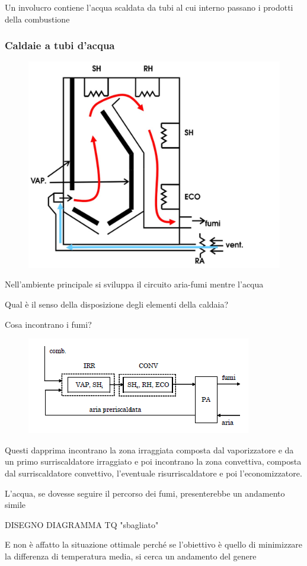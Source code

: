 \begin{adjustwidth}{2in}{}
			Un involucro contiene l'acqua scaldata da tubi al cui interno passano i prodotti della combustione
\subsubsection{Caldaie a tubi d'acqua}
			\begin{figure}[H]
				\centering
				\includegraphics[width=0.5\linewidth]{immagini/Immagine12}
				\label{fig:immagine12}
			\end{figure}			
			Nell'ambiente principale si sviluppa il circuito aria-fumi mentre l'acqua 
			
			Qual è il senso della disposizione degli elementi della caldaia? 
		
			Cosa incontrano i fumi? 
			\begin{figure}[H]
				\centering
				\includegraphics[width=0.5\linewidth]{immagini/GeneratoreVapore1}
				\label{fig:generatorevapore1}
			\end{figure}
			Questi dapprima incontrano la zona irraggiata composta dal vaporizzatore e da un primo surriscaldatore irraggiato e poi incontrano la zona convettiva, composta dal surriscaldatore convettivo, l'eventuale risurriscaldatore e poi l'economizzatore. \newline 
			
			L'acqua, se dovesse seguire il percorso dei fumi, presenterebbe un andamento simile 
			
			DISEGNO DIAGRAMMA TQ "sbagliato"
			
			E non è affatto la situazione ottimale perché se l'obiettivo è quello di minimizzare la differenza di temperatura media, si cerca un andamento del genere
			

\end{adjustwidth}
